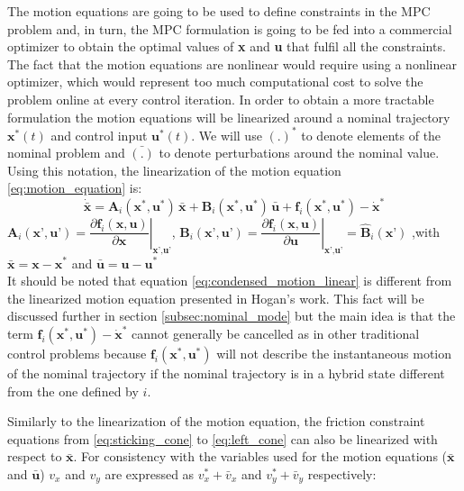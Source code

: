 \documentclass[12,twoside]{TFG-GM}
\theoremstyle{definition}
\theoremstyle{remark}
\newcommand*\diff[1]{\bar{#1}}
\begin{document}
The motion equations are going to be used to define constraints in the MPC problem and, in turn, the MPC formulation is going to be fed into a commercial optimizer to obtain the optimal values of \textbf{x} and \textbf{u} that fulfil all the constraints. The fact that the motion equations are nonlinear would require using a nonlinear optimizer, which would represent too much computational cost to solve the problem online at every control iteration. In order to obtain a more tractable formulation the motion equations will be linearized around a nominal trajectory $\textbf{x}^*(t)$ and control input $\textbf{u}^*(t)$. We will use $(.)^*$ to denote elements of the nominal problem and $\diff{(.)}$ to denote perturbations around the nominal value. Using this notation, the linearization of the motion equation \ref{eq:motion_equation} is:
\begin{equation} \label{eq:condensed_motion_linear}
\dot{\diff{\textbf{x}}} = \textbf{A}_i(\textbf{x}^*, \textbf{u}^*) \, \diff{\textbf{x}} + \textbf{B}_i(\textbf{x}^*, \textbf{u}^*)\, \diff{\textbf{u}} + \textbf{f}_i(\textbf{x}^*, \textbf{u}^*) - \dot{\textbf{x}}^*
\end{equation}
$\textbf{A}_i(\textbf{x'}, \textbf{u'}) = \left.\dfrac{\partial \textbf{f}_i(\textbf{x}, \textbf{u})}{\partial \textbf{x}}\right|_{\textbf{x'}, \textbf{u'}}$, $\textbf{B}_i(\textbf{x'}, \textbf{u'}) = \left.\dfrac{\partial \textbf{f}_i(\textbf{x}, \textbf{u})}{\partial \textbf{u}}\right|_{\textbf{x'}, \textbf{u'}} = \hat{\textbf{B}}_i(\textbf{x'})$
,with $\diff{\textbf{x}} = \textbf{x} - \textbf{x}^*$ and $\diff{\textbf{u}} = \textbf{u} - \textbf{u}^*$ \\

It should be noted that equation \ref{eq:condensed_motion_linear} is different from the linearized motion equation presented in Hogan's work. This fact will be discussed further in section \ref{subsec:nominal_mode} but the main idea is that the term $\textbf{f}_i(\textbf{x}^*, \textbf{u}^*) - \dot{\textbf{x}}^*$ cannot generally be cancelled as in other traditional control problems because $\textbf{f}_i(\textbf{x}^*, \textbf{u}^*)$ will not describe the instantaneous motion of the nominal trajectory if the nominal trajectory is in a hybrid state different from the one defined by $i$.

Similarly to the linearization of the motion equation, the friction constraint equations from \ref{eq:sticking_cone} to \ref{eq:left_cone} can also be linearized with respect to $\diff{\textbf{x}}$. For consistency with the variables used for the motion equations ($\diff{\textbf{x}}$ and $\diff{\textbf{u}}$) $v_x$ and $v_y$ are expressed as $v_x^* + \diff{v}_x$ and $v_y^* + \diff{v}_y$ respectively:
\end{document}
